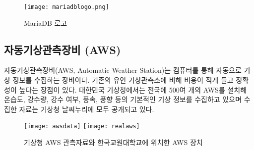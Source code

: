 \begin{figure}[htbp]
	\centering
	\texttt{[image: mariadblogo.png]}
	\caption{MariaDB 로고}
	\label{MariaDB}
\end{figure}

\subsection{자동기상관측장비 (AWS)}
자동기상관측장비(AWS, Automatic Weather Station)는 컴퓨터를 통해 자동으로 기상 정보를 수집하는 장비이다. 기존의 유인 기상관측소에 비해 비용이 적게 들고 정확성이 높다는 장점이 있다. 대한민국 기상청에서는 전국에 500여 개의 AWS를 설치해 온습도, 강수량, 강수 여부, 풍속, 풍향 등의 기본적인 기상 정보를 수집하고 있으며 수집한 자료는 기상청 날씨누리에 모두 공개되고 있다.

\begin{figure}[htbp]
	\centering
	\texttt{[image: awsdata]}
	\texttt{[image: realaws]}
	\caption{기상청 AWS 관측자료와 한국교원대학교에 위치한 AWS 장치}
	\label{AWS}
\end{figure}